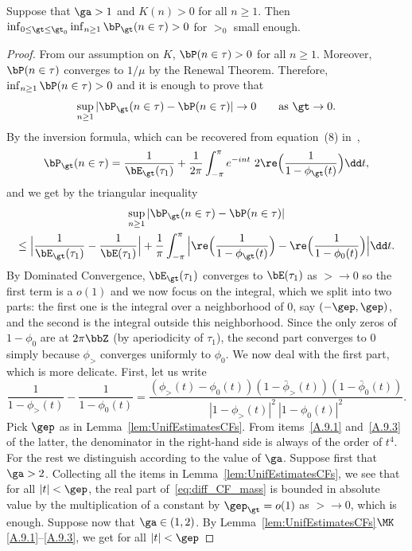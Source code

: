 \begin{lemm}\label{lem:UniformPositive}
Suppose that $\ga > 1$ and $K(n)> 0$ for all $n\ge 1$. Then $\inf_{0 \le \gt \le \gt_0} \inf_{n\ge 1} \bP_\gt(n\in\tau) > 0$ for $\gt_0$ small enough.
\end{lemm}

\begin{proof}
From our assumption on $K$, $\bP(n\in\tau) >0$ for all $n\ge 1$. Moreover, $\bP(n\in\tau)$ converges to $1/\mu$ by the Renewal Theorem. Therefore, $\inf_{n\ge 1} \bP(n\in\tau) > 0$ and it is enough to prove that
\begin{equation}
\sup_{n\ge 1} |\bP_\gt(n\in\tau) - \bP(n\in\tau)| \rightarrow 0 \qquad
\text{as } \gt \to 0.
\end{equation} By the inversion formula, which can be recovered from equation~(8) in~\cite[Chapter~II.9]{Spitzer},
\begin{equation} \bP_\gt(n\in\tau) =
\frac{1}{\bE_\gt (\tau_1)} + \frac{1}{2\pi} \int_{-\pi}^{\pi} e^{-int}\ 2
\re\Big(\frac{1}{1- \phi_\gt(t)}\Big) \dd t,
\end{equation}
and we get by the triangular inequality
\begin{multline}
\sup_{n\ge 1} |\bP_\gt(n\in\tau) - \bP(n\in\tau)|\\
\le
\Big| \frac{1}{\bE_\gt (\tau_1)} - \frac{1}{\bE (\tau_1)}\Big| +
\frac{1}{\pi} \int_{-\pi}^{\pi} \Big| \re\Big(\frac{1}{1- \phi_\gt(t)}\Big) - \re\Big(\frac{1}{1- \phi_0(t)}\Big) \Big| \dd t.
\end{multline}
By Dominated Convergence, $\bE_\gt (\tau_1)$ converges to $\bE (\tau_1)$ as $\gt \to 0$ so the first term is a $o(1)$ and we now focus on the integral, which we split into two parts: the first one is the integral over a neighborhood of $0$, say $(-\gep,\gep)$, and the second is the integral outside this neighborhood. Since the only zeros of $1- \phi_0$ are at $2\pi\bbZ$ (by aperiodicity of $\tau_1$), the second part converges to $0$ simply because $\phi_\gt$ converges uniformly to $\phi_0$. We now deal with the first part, which is more delicate. First, let us write
\begin{equation} \label{eq:diff_CF_mass}
\frac{1}{1- \phi_\gt(t)} - \frac{1}{1- \phi_0(t)} = \frac{(\phi_\gt(t) - \phi_0(t)) (1- \bar \phi_\gt(t)) (1- \bar \phi_0(t))}{|1- \phi_\gt(t)|^2\ |1- \phi_0(t)|^2}.
\end{equation} Pick $\gep$ as in Lemma~\ref{lem:UnifEstimatesCFs}. From items~\eqref{A.9.1} and~\eqref{A.9.3} of the latter, the denominator in the right-hand side is always of the order of $t^4$. For the rest we distinguish according to the value of $\ga$. Suppose first that $\ga > 2$. Collecting all the items in Lemma~\ref{lem:UnifEstimatesCFs}, we see that for all $|t|<\gep$, the real part of~\eqref{eq:diff_CF_mass} is bounded in absolute value by the multiplication of a constant by $\gep_\gt = o(1)$ as $\gt \to 0$, which is enough. Suppose now that $\ga \in (1,2)$. By Lemma~\ref{lem:UnifEstimatesCFs}$\MK$\eqref{A.9.1}--\eqref{A.9.3}, we get for all $|t|<\gep$

\end{proof}
